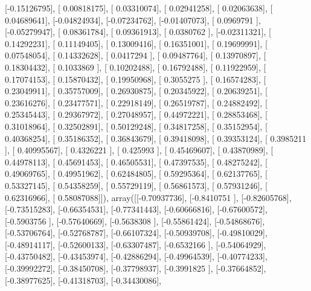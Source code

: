 \documentclass{article}
\begin{document}
       [-0.15126795],
       [ 0.00818175],
       [ 0.03310074],
       [ 0.02941258],
       [ 0.02063638],
       [ 0.04689641],
       [-0.04824934],
       [-0.07234762],
       [-0.01407073],
       [ 0.0969791 ],
       [-0.05279947],
       [ 0.08361784],
       [ 0.09361913],
       [ 0.0380762 ],
       [-0.02311321],
       [ 0.14292231],
       [ 0.11149405],
       [ 0.13009416],
       [ 0.16351001],
       [ 0.19699991],
       [ 0.07548054],
       [ 0.14332628],
       [ 0.0417294 ],
       [ 0.09487764],
       [ 0.13970897],
       [ 0.18304432],
       [ 0.1033869 ],
       [ 0.10202488],
       [ 0.16792488],
       [ 0.11922959],
       [ 0.17074153],
       [ 0.15870432],
       [ 0.19950968],
       [ 0.3055275 ],
       [ 0.16574283],
       [ 0.23049911],
       [ 0.35757009],
       [ 0.26930875],
       [ 0.20345922],
       [ 0.20639251],
       [ 0.23616276],
       [ 0.23477571],
       [ 0.22918149],
       [ 0.26519787],
       [ 0.24882492],
       [ 0.25345443],
       [ 0.29367972],
       [ 0.27048957],
       [ 0.44972221],
       [ 0.28853468],
       [ 0.31018964],
       [ 0.32502891],
       [ 0.50129248],
       [ 0.34817258],
       [ 0.35152954],
       [ 0.40368254],
       [ 0.35186352],
       [ 0.36843679],
       [ 0.39418098],
       [ 0.39353124],
       [ 0.3985211 ],
       [ 0.40995567],
       [ 0.4326221 ],
       [ 0.425993  ],
       [ 0.45469607],
       [ 0.43870989],
       [ 0.44978113],
       [ 0.45691453],
       [ 0.46505531],
       [ 0.47397535],
       [ 0.48275242],
       [ 0.49069765],
       [ 0.49951962],
       [ 0.62484805],
       [ 0.59295364],
       [ 0.62137765],
       [ 0.53327145],
       [ 0.54358259],
       [ 0.55729119],
       [ 0.56861573],
       [ 0.57931246],
       [ 0.62316966],
       [ 0.58087088]]), array([[-0.70937736],
       [-0.8410751 ],
       [-0.82605768],
       [-0.73515283],
       [-0.66354531],
       [-0.77341443],
       [-0.60666816],
       [-0.67600572],
       [-0.5903756 ],
       [-0.57640669],
       [-0.5638308 ],
       [-0.55861424],
       [-0.54868676],
       [-0.53706764],
       [-0.52768787],
       [-0.66107324],
       [-0.50939708],
       [-0.49810029],
       [-0.48914117],
       [-0.52600133],
       [-0.63307487],
       [-0.6532166 ],
       [-0.54064929],
       [-0.43750482],
       [-0.43453974],
       [-0.42886294],
       [-0.49964539],
       [-0.40774233],
       [-0.39992272],
       [-0.38450708],
       [-0.37798937],
       [-0.3991825 ],
       [-0.37664852],
       [-0.38977625],
       [-0.41318703],
       [-0.34430086],
\end{document}
